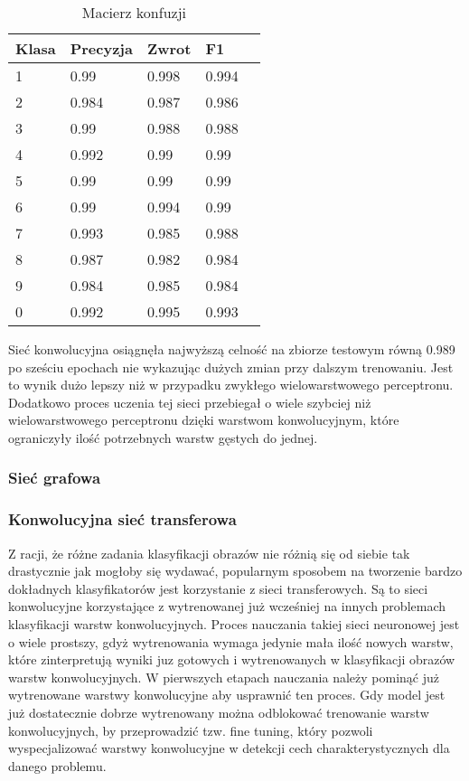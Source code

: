 \documentclass{article}
\begin{document}
\begin{table}[H]
    \centering
    \begin{tabular}{|l|l|l|l|l|}
    \hline
    Klasa & Precyzja & Zwrot & F1 \\
    \hline
    1     & 0.99     & 0.998 & 0.994 \\
    2     & 0.984    & 0.987 & 0.986 \\
    3     & 0.99     & 0.988 & 0.988 \\
    4     & 0.992    & 0.99  & 0.99  \\
    5     & 0.99     & 0.99  & 0.99  \\
    6     & 0.99     & 0.994 & 0.99  \\
    7     & 0.993    & 0.985 & 0.988 \\
    8     & 0.987    & 0.982 & 0.984 \\
    9     & 0.984    & 0.985 & 0.984 \\
    0     & 0.992    & 0.995 & 0.993 \\
    \hline
    \end{tabular}
    \caption{Macierz konfuzji}
\end{table}

Sieć konwolucyjna osiągnęła najwyższą celność na zbiorze testowym równą 0.989 po 
sześciu epochach nie wykazując dużych zmian przy dalszym 
trenowaniu. Jest to wynik dużo lepszy niż w przypadku zwykłego wielowarstwowego 
perceptronu. Dodatkowo proces uczenia tej sieci przebiegał o wiele szybciej niż 
wielowarstwowego perceptronu dzięki warstwom konwolucyjnym, które ograniczyły ilość 
potrzebnych warstw gęstych do jednej.

\subsubsection{Sieć grafowa}

\subsubsection{Konwolucyjna sieć transferowa}
Z racji, że różne zadania klasyfikacji obrazów nie różnią się od siebie tak drastycznie jak 
mogłoby się wydawać, popularnym sposobem na tworzenie bardzo dokładnych 
klasyfikatorów jest korzystanie z sieci transferowych. Są to sieci konwolucyjne korzystające 
z wytrenowanej już wcześniej na innych problemach klasyfikacji warstw konwolucyjnych. 
Proces nauczania takiej sieci neuronowej jest o wiele prostszy, gdyż wytrenowania wymaga 
jedynie mała ilość nowych warstw, które zinterpretują wyniki juz gotowych i wytrenowanych 
w klasyfikacji obrazów warstw konwolucyjnych. W pierwszych etapach nauczania należy pominąć 
już wytrenowane warstwy konwolucyjne aby usprawnić ten proces. Gdy model jest już dostatecznie 
dobrze wytrenowany można odblokować trenowanie warstw konwolucyjnych, by przeprowadzić tzw. 
fine tuning, który pozwoli wyspecjalizować warstwy konwolucyjne w detekcji cech charakterystycznych dla danego problemu. 
\end{document}
